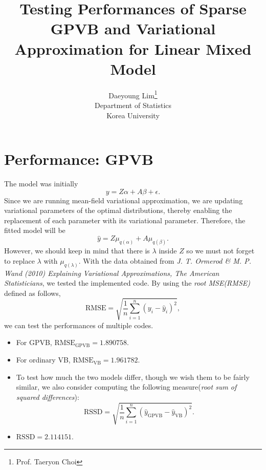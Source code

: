 \documentclass[11pt]{article}
\begin{document}
\nocite{*}

\title{Testing Performances of Sparse GPVB and Variational Approximation for Linear Mixed Model}

\author{Daeyoung Lim\thanks{Prof. Taeryon Choi} \\
Department of Statistics \\
Korea University}

\maketitle

\section{Performance: GPVB}
  The model was initially
  $$
    y = Z\alpha + A\beta + \epsilon.
  $$
  Since we are running mean-field variational approximation, we are updating variational parameters of the optimal distributions, thereby enabling the replacement of each parameter with its variational parameter. Therefore, the fitted model will be
  $$
    \hat{y} = Z\mu_{q\left(\alpha\right)} + A\mu_{q\left(\beta\right)}.
  $$
  However, we should keep in mind that there is $\lambda$ inside $Z$ so we must not forget to replace $\lambda$ with $\mu_{q\left(\lambda\right)}$. With the data obtained from \emph{J. T. Ormerod \& M. P. Wand (2010) Explaining Variational Approximations, The American Statisticians}, we tested the implemented code. By using the \emph{root MSE(RMSE)} defined as follows,
  $$
    \text{RMSE} = \sqrt{\frac{1}{n}\sum_{i=1}^{n}\left(y_{i}-\hat{y}_{i}\right)^{2}},
  $$
  we can test the performances of multiple codes.
  \begin{itemize}
    \item For GPVB, $\text{RMSE}_{\text{GPVB}}= 1.890758$.
    \item For ordinary VB, $\text{RMSE}_{\text{VB}} = 1.961782$.
    \item To test how much the two models differ, though we wish them to be fairly similar, we also consider computing the following measure(\emph{root sum of squared differences}): 
    $$
      \text{RSSD} = \sqrt{\frac{1}{n}\sum_{i=1}^{n}\left(\hat{y}_{\text{GPVB}}-\hat{y}_{\text{VB}} \right)^{2}}.
    $$
    \item $\text{RSSD} = 2.114151$.
  \end{itemize}
\end{document}
